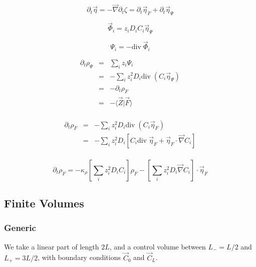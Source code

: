 \documentclass[aps,12pt]{revtex4}
\begin{document}
\begin{equation}
	\partial_t \vec \eta = - \vec\nabla \partial_t \zeta = \partial_t \vec\eta_F + \partial_t \vec\eta_\Psi
\end{equation}

\begin{equation}
	\vec \Phi_i = z_i D_i C_i \vec\eta_\Psi
\end{equation}

\begin{equation}
	\Psi_i = - \mathrm{div}\; \vec \Phi_i 
\end{equation}

\begin{equation}
\begin{array}{rcl}
	\partial_t \rho_\Psi & = & \sum_i z_i \Psi_i \\
	& = &  - \sum_i z_i^2 D_i \mathrm{div}\;(C_i \vec \eta_\Psi)\\
	& = &  - \partial_t \rho_F\\
	& = &  - \langle \vec Z \vert \vec F \rangle \\
\end{array}
\end{equation}

\begin{equation}
\begin{array}{rcl}
\partial_t \rho_F & = & - \sum_i z_i^2 D_i \mathrm{div}\;(C_i \vec \eta_F)\\
 & = & - \sum_i z_i^2 D_i \left[ C_i \mathrm{div}\;  \vec \eta_F + \vec \eta_F \cdot \vec \nabla C_i \right]\\
 \end{array}
\end{equation}

\begin{equation}
\partial_t \rho_F  = - \kappa_\rho \left[\sum_i z_i^2 D_i C_i\right] \rho_F - 
\left[\sum_i z_i^2 D_i \vec \nabla C_i \right] \cdot \vec \eta_F
\end{equation}


\subsection{Finite Volumes}

\subsubsection{Generic}

We take a linear part of length $2L$, and a control volume between $L_-=L/2$ and $L_+=3L/2$,
with boundary conditions $\vec C_0$ and $\vec C_L$.
\end{document}
